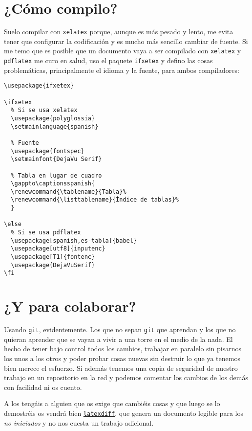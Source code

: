 \section{¿Cómo compilo?}

Suelo compilar con \lstinline!xelatex! porque, aunque es más pesado y
lento, me evita tener que configurar la codificación y es mucho más
sencillo cambiar de fuente. Si me temo que es posible que un documento
vaya a ser compilado con \lstinline!xelatex! y \lstinline!pdflatex! me
curo en salud, uso el paquete \lstinline!ifxetex! y defino las cosas
problemáticas, principalmente el idioma y la fuente, para ambos
compiladores:

\begin{lstlisting}[language={[latex]tex}]
\usepackage{ifxetex}

\ifxetex
  % Si se usa xelatex
  \usepackage{polyglossia}
  \setmainlanguage{spanish}
  
  % Fuente
  \usepackage{fontspec}
  \setmainfont{DejaVu Serif}
  
  % Tabla en lugar de cuadro
  \gappto\captionsspanish{
  \renewcommand{\tablename}{Tabla}%
  \renewcommand{\listtablename}{Índice de tablas}%
  }
  
\else
  % Si se usa pdflatex
  \usepackage[spanish,es-tabla]{babel}
  \usepackage[utf8]{inputenc} 
  \usepackage[T1]{fontenc}
  \usepackage{DejaVuSerif}
\fi
\end{lstlisting}

\section{¿Y para colaborar?}

Usando \lstinline!git!, evidentemente. Los que no sepan \lstinline!git!
que aprendan y los que no quieran aprender que se vayan a vivir a una
torre en el medio de la nada. El hecho de tener bajo control todos los
cambios, trabajar en paralelo sin pisarnos los unos a los otros y poder
probar cosas nuevas sin destruir lo que ya tenemos bien merece el
esfuerzo. Si además tenemos una copia de seguridad de nuestro trabajo en
un repositorio en la red y podemos comentar los cambios de los demás con
facilidad ni os cuento.

A los tengáis a alguien que os exige que cambiéis cosas y que luego se
lo demostréis os vendrá bien
\href{https://www.ctan.org/pkg/latexdiff?lang=en}{\lstinline!latexdiff!},
que genera un documento legible para los \emph{no iniciados} y no nos
cuesta un trabajo adicional.


